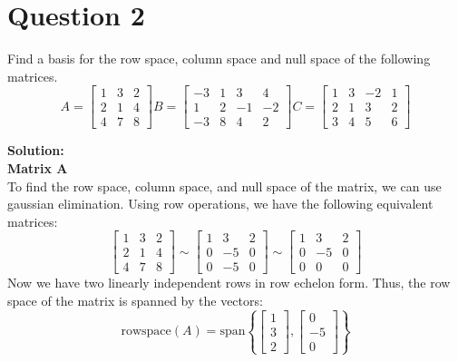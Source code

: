 \documentclass{article}
\begin{document}
\newpage
\section*{Question 2}
Find a basis for the row space, column space and null space of the following matrices.
$$
A = \begin{bmatrix} 1 & 3 & 2 \\ 2 & 1 & 4 \\ 4 & 7 & 8 \end{bmatrix}
B = \begin{bmatrix} -3 & 1 & 3 & 4 \\ 1 & 2 & -1 & -2 \\ -3 & 8 & 4 & 2 \end{bmatrix}
C = \begin{bmatrix} 1 & 3 & -2 & 1 \\ 2 & 1 & 3 & 2 \\ 3 & 4 & 5 & 6 \end{bmatrix}
$$

\noindent\textbf{Solution:} \\
\noindent\textbf{Matrix A} \\
To find the row space, column space, and null space of the matrix, we can use gaussian elimination.
Using row operations, we have the following equivalent matrices:
$$
\begin{bmatrix} 1 & 3 & 2 \\ 2 & 1 & 4 \\ 4 & 7 & 8 \end{bmatrix}
\sim
\begin{bmatrix} 1 & 3 & 2 \\ 0 & -5 & 0 \\ 0 & -5 & 0 \end{bmatrix}
\sim
\begin{bmatrix} 1 & 3 & 2 \\ 0 & -5 & 0 \\ 0 & 0 & 0 \end{bmatrix}
$$
Now we have two linearly independent rows in row echelon form.
Thus, the row space of the matrix is spanned by the vectors:
$$ \text{rowspace}(A) = \text{span}\left\{ \begin{bmatrix} 1 \\ 3 \\ 2 \end{bmatrix}, \begin{bmatrix} 0 \\ -5 \\ 0 \end{bmatrix} \right\} $$
\end{document}
